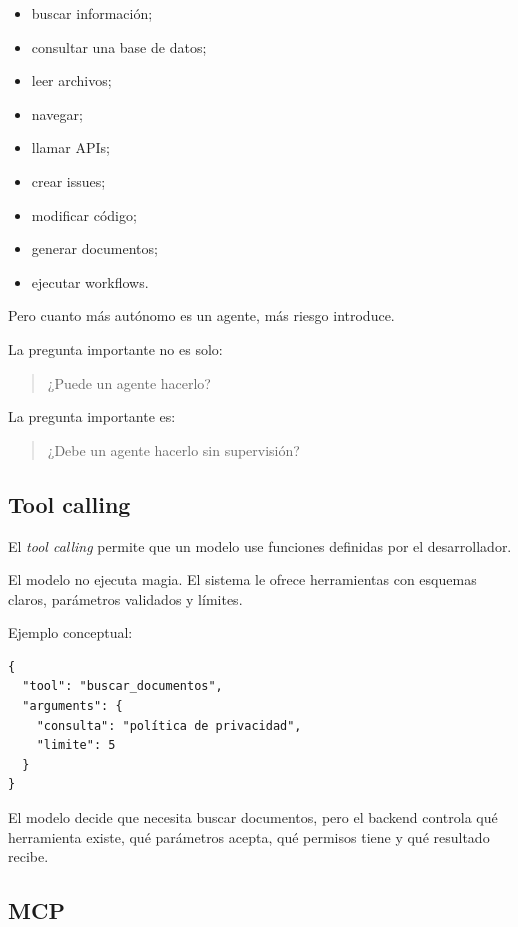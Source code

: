 \begin{itemize}
\tightlist
\item
  buscar información;
\item
  consultar una base de datos;
\item
  leer archivos;
\item
  navegar;
\item
  llamar APIs;
\item
  crear issues;
\item
  modificar código;
\item
  generar documentos;
\item
  ejecutar workflows.
\end{itemize}

Pero cuanto más autónomo es un agente, más riesgo introduce.

La pregunta importante no es solo:

\begin{quote}
¿Puede un agente hacerlo?
\end{quote}

La pregunta importante es:

\begin{quote}
¿Debe un agente hacerlo sin supervisión?
\end{quote}

\subsection{Tool calling}\label{tool-calling}

El \emph{tool calling} permite que un modelo use funciones definidas por
el desarrollador.

El modelo no ejecuta magia. El sistema le ofrece herramientas con
esquemas claros, parámetros validados y límites.

Ejemplo conceptual:

\begin{lstlisting}
{
  "tool": "buscar_documentos",
  "arguments": {
    "consulta": "política de privacidad",
    "limite": 5
  }
}
\end{lstlisting}

El modelo decide que necesita buscar documentos, pero el backend
controla qué herramienta existe, qué parámetros acepta, qué permisos
tiene y qué resultado recibe.

\subsection{MCP}\label{mcp}

